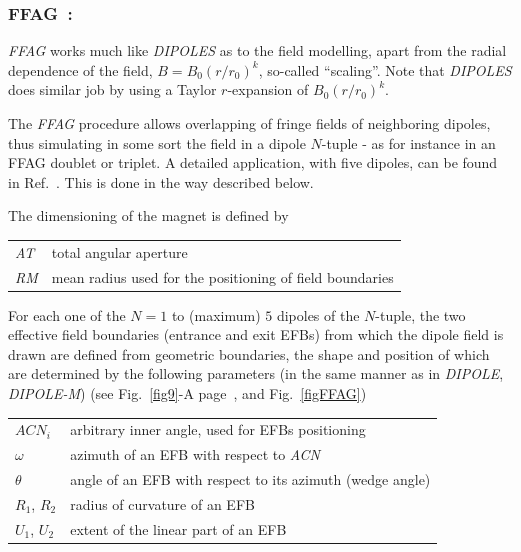\newpage


\subsubsection*{FFAG~: \FFAGTitl~\cite{reportNIMFFAG,reportICFAFFAG}} \label{FFAG}   
\medskip

\noindent \textsl{FFAG} works much like \textsl{DIPOLES} 
as to the field modelling, apart from the  radial dependence of the field, $B=B_0(r/r_0)^k$, so-called ``scaling''. 
Note that \textsl{DIPOLES} does similar job by using a Taylor $r$-expansion of $B_0(r/r_0)^k$. 

\medskip

\noindent The \textsl{FFAG} procedure allows overlapping of fringe fields of neighboring dipoles, 
thus simulating in some sort the field in a dipole $N$-tuple - as for instance in an FFAG doublet 
or triplet. A detailed application, with 
five dipoles, can be found in Ref.~\cite{reportNIMFFAG}. This is done in the way described below. 

\medskip

\noindent  The dimensioning of the magnet is defined by

\medskip

 \begin{tabular}{>{\sl}l!{~:}l}
	 AT &  total angular aperture \\
	 RM & mean radius used for the positioning of field boundaries\\
 \end{tabular}

\medskip

\noindent For each one of the $N=1$ to (maximum) $5$ dipoles of the  $N$-tuple, 
the two  effective field boundaries (entrance and exit EFBs) from which  the dipole field  is drawn are
defined from geometric boundaries, the shape and position of which are determined by the 
following parameters (in the same manner as in \textsl{DIPOLE}, \textsl{DIPOLE-M})
 (see Fig.~\ref{fig9}-A page~\pageref{fig9}, and Fig.~\ref{figFFAG}) 

\medskip

\begin{tabular}{l!{~:}l}
	$ACN_i$  & arbitrary inner angle, used for EFBs positioning  \\
	$\omega$ &  azimuth of an EFB with respect to  \textsl{ACN}\\
	$\theta$ & angle of an EFB with respect to its azimuth (wedge angle)\\ 
	$R_1$, $R_2$  &  radius of curvature of an EFB\\
	$U_1$, $U_2$  &  extent of the linear part of an EFB  \\
\end{tabular}

